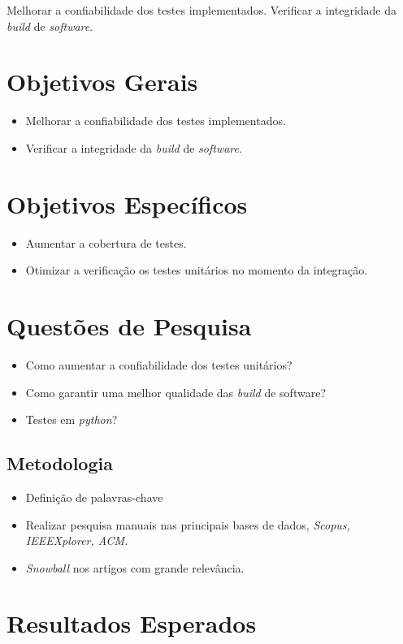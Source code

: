 Melhorar a confiabilidade dos testes implementados.
Verificar a integridade da \textit{build} de \textit{software}.

\section{Objetivos Gerais}
\begin{itemize}
    \item Melhorar a confiabilidade dos testes implementados.
    \item Verificar a integridade da \textit{build} de \textit{software}.
\end{itemize}

\section{Objetivos Específicos }
\begin{itemize}
    \item Aumentar a cobertura de testes.
    \item Otimizar a verificação os testes unitários no momento da integração.
\end{itemize}

\section{Questões de Pesquisa}
\begin{itemize}
    \item Como aumentar a confiabilidade dos testes unitários?
    \item Como garantir uma melhor qualidade das \textit{build} de software?
    \item Testes em \textit{python}?
\end{itemize}

\subsection{Metodologia}
\begin{itemize}
    \item Definição de palavras-chave
    \item Realizar pesquisa manuais nas principais bases de dados,\textit{ Scopus, IEEEXplorer, ACM.}
    \item \textit{Snowball} nos artigos com grande relevância.
\end{itemize}

\section{Resultados Esperados}
